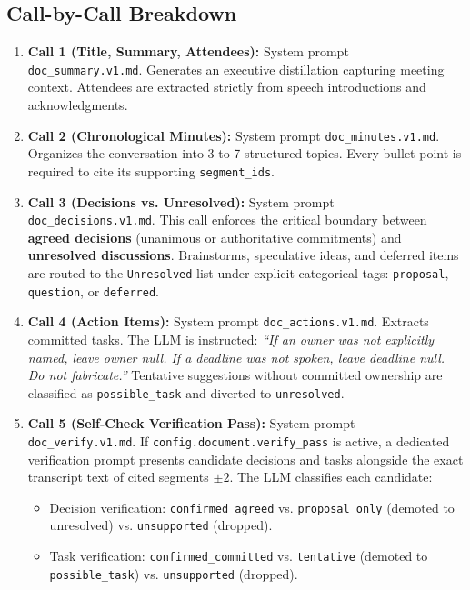 \documentclass[10pt,a4paper]{article}
\begin{document}
\subsection{Call-by-Call Breakdown}
\begin{enumerate}[label=\textbf{\arabic*.}]
    \item \textbf{Call 1 (Title, Summary, Attendees):} System prompt \texttt{doc\_summary.v1.md}. Generates an executive distillation capturing meeting context. Attendees are extracted strictly from speech introductions and acknowledgments.
    \item \textbf{Call 2 (Chronological Minutes):} System prompt \texttt{doc\_minutes.v1.md}. Organizes the conversation into 3 to 7 structured topics. Every bullet point is required to cite its supporting \texttt{segment\_ids}.
    \item \textbf{Call 3 (Decisions vs. Unresolved):} System prompt \texttt{doc\_decisions.v1.md}. This call enforces the critical boundary between \textbf{agreed decisions} (unanimous or authoritative commitments) and \textbf{unresolved discussions}. Brainstorms, speculative ideas, and deferred items are routed to the \texttt{Unresolved} list under explicit categorical tags: \texttt{proposal}, \texttt{question}, or \texttt{deferred}.
    \item \textbf{Call 4 (Action Items):} System prompt \texttt{doc\_actions.v1.md}. Extracts committed tasks. The LLM is instructed: \textit{``If an owner was not explicitly named, leave owner null. If a deadline was not spoken, leave deadline null. Do not fabricate.''} Tentative suggestions without committed ownership are classified as \texttt{possible\_task} and diverted to \texttt{unresolved}.
    \item \textbf{Call 5 (Self-Check Verification Pass):} System prompt \texttt{doc\_verify.v1.md}. If \texttt{config.document.verify\_pass} is active, a dedicated verification prompt presents candidate decisions and tasks alongside the exact transcript text of cited segments $\pm 2$. The LLM classifies each candidate:
    \begin{itemize}
        \item Decision verification: \texttt{confirmed\_agreed} vs. \texttt{proposal\_only} (demoted to unresolved) vs. \texttt{unsupported} (dropped).
        \item Task verification: \texttt{confirmed\_committed} vs. \texttt{tentative} (demoted to \texttt{possible\_task}) vs. \texttt{unsupported} (dropped).
    \end{itemize}
\end{enumerate}
\end{document}
